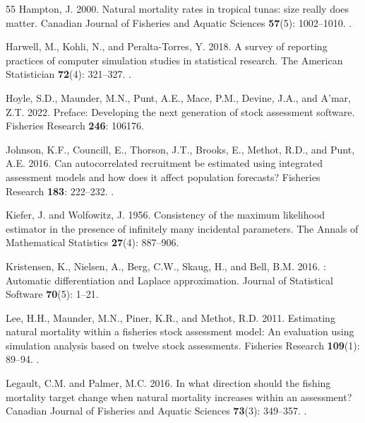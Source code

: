\documentclass[
  12pt,
]{article}
\begin{document}
\begin{thebibliography}{55}
Hampton, J. 2000.
\newblock Natural mortality rates in tropical tunas: size really does matter.
\newblock Canadian Journal of Fisheries and Aquatic Sciences \textbf{57}(5): 1002--1010.
\newblock {}.

Harwell, M., Kohli, N., and Peralta-Torres, Y. 2018.
\newblock A survey of reporting practices of computer simulation studies in statistical research.
\newblock The American Statistician \textbf{72}(4): 321--327.
\newblock {}.

Hoyle, S.D., Maunder, M.N., Punt, A.E., Mace, P.M., Devine, J.A., and A’mar, Z.T. 2022.
\newblock Preface: Developing the next generation of stock assessment software.
\newblock Fisheries Research \textbf{246}: 106176.

Johnson, K.F., Councill, E., Thorson, J.T., Brooks, E., Methot, R.D., and Punt, A.E. 2016.
\newblock Can autocorrelated recruitment be estimated using integrated assessment models and how does it affect population forecasts?
\newblock Fisheries Research \textbf{183}: 222--232.
\newblock {}.

Kiefer, J. and Wolfowitz, J. 1956.
\newblock Consistency of the maximum likelihood estimator in the presence of infinitely many incidental parameters.
\newblock The Annals of Mathematical Statistics \textbf{27}(4): 887--906.

Kristensen, K., Nielsen, A., Berg, C.W., Skaug, H., and Bell, B.M. 2016.
: Automatic differentiation and {L}aplace approximation.
\newblock Journal of Statistical Software \textbf{70}(5): 1--21.

Lee, H.H., Maunder, M.N., Piner, K.R., and Methot, R.D. 2011.
\newblock Estimating natural mortality within a fisheries stock assessment model: An evaluation using simulation analysis based on twelve stock assessments.
\newblock Fisheries Research \textbf{109}(1): 89--94.
\newblock {}.

Legault, C.M. and Palmer, M.C. 2016.
\newblock In what direction should the fishing mortality target change when natural mortality increases within an assessment?
\newblock Canadian Journal of Fisheries and Aquatic Sciences \textbf{73}(3): 349--357.
\newblock {}.


\end{thebibliography}
\end{document}
